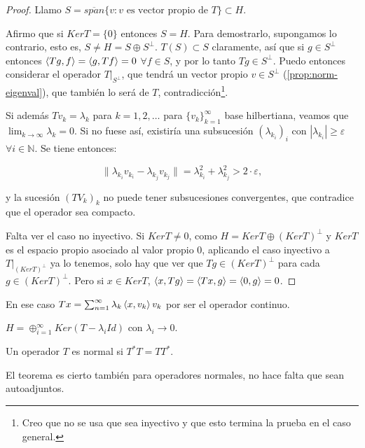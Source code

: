 \begin{proof}
  Llamo $S=\overline{span}\{v:v\text{ es vector propio de } T\}\subset H$.
  
  Afirmo que si $Ker T=\{0\} $ entonces $S=H$. Para demostrarlo, supongamos lo
  contrario, esto es, $S\neq H=S \oplus S^\bot$. $T(S)\subset S$
  claramente, así que si $g\in S^\bot$ entonces $\left\langle Tg,f\right\rangle=\left\langle g,Tf\right\rangle=0$ $\forall
  f\in S$, y por lo tanto $Tg\in S^\bot$. Puedo entonces considerar el operador
   $T|_{S^\bot}$, que tendrá un vector propio $v\in S^\bot$
   (\ref{prop:norm-eigenval}), que también lo será de $T$,
   contradicción\footnote{Creo que no se usa que sea inyectivo y que esto
   termina la prueba en el caso general.}.
  
  Si además $Tv_k=\lambda_k$ para $k=1,2,\ldots$ para $\{v_k\}_{k=1}^\infty $ 
  base hilbertiana, veamos que $\lim_{k \to \infty} \lambda_k=0$. Si no fuese
  así, existiría una subsucesión $(\lambda_{k_i})_i$ con $|\lambda_{k_i}|\ge
  \varepsilon$ $\forall i \in \mathbb{N}$. Se tiene entonces:

  \[
  \|\lambda_{k_i}v_{k_i}-\lambda_{k_j}v_{k_j}\|
  =\lambda_{k_i}^2+\lambda_{k_j}^2>2\cdot \varepsilon
  ,\] 

  y la sucesión $(TV_{k})_k$ no puede tener subsucesiones convergentes, que
  contradice que el operador sea compacto.

  Falta ver el caso no inyectivo. Si $KerT\neq 0$, como $H=KerT \oplus
  (KerT)^\bot$ y $KerT$ es el espacio propio asociado al valor propio $0$,
  aplicando el caso inyectivo a $T|_{(KerT)^\bot}$ ya lo tenemos, solo hay que
  ver que $Tg\in (KerT)^\bot$ para cada $g\in (KerT)^\bot$. Pero si $x\in KerT$,
  $\left\langle x,Tg\right\rangle=\left\langle Tx,g\right\rangle=\left\langle0,g\right\rangle=0$.
\end{proof}

\begin{remark}
  En ese caso $Tx=\sum_{n=1}^{\infty} \lambda_k\left\langle x,v_k\right\rangle v_k$ por ser el
  operador continuo.
\end{remark}

\begin{remark}
  $H=\oplus_{i=1}^\infty Ker(T-\lambda_i Id)$ con $\lambda_i\to 0$.
\end{remark}

\begin{definition}
  Un operador $T$ es normal si $T^*T=TT^*$.
\end{definition}

El teorema es cierto también para operadores normales, no hace falta que sean
autoadjuntos.

